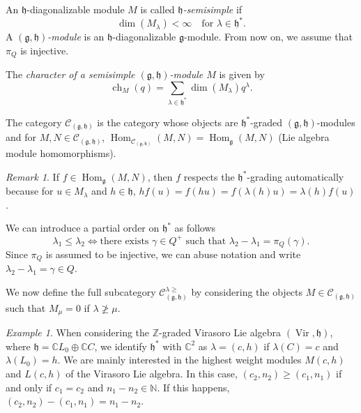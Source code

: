 \documentclass[a4paper, 12pt, reqno]{amsart}
\theoremstyle{remark}
\newtheorem{remark}[theorem]{Remark}
\newtheorem{example}[theorem]{Example}
\DeclareMathOperator{\Vir}{Vir}
\DeclareMathOperator{\ch}{ch}
\DeclareMathOperator{\Hom}{Hom}
\begin{document}
An $\mathfrak{h}$-diagonalizable module $M$ is called \emph{$\mathfrak{h}$-semisimple} if
\begin{equation*}
  \dim(M_{\lambda}) < \infty \quad \text{for $\lambda \in \mathfrak{h}^*$}.
\end{equation*}
A \emph{$(\mathfrak{g}, \mathfrak{h})$-module} is an $\mathfrak{h}$-diagonalizable $\mathfrak{g}$-module.
From now on, we assume that $\pi_Q$ is injective.

The \emph{character of a semisimple $(\mathfrak{g}, \mathfrak{h})$-module $M$} is given by
\begin{equation*}
  \ch_M(q) = \sum_{\lambda \in \mathfrak{h}^*}\dim(M_{\lambda})q^{\lambda}.
\end{equation*}

The category $\mathcal{C}_{(\mathfrak{g}, \mathfrak{h})}$ is the category whose objects are $\mathfrak{h}^*$-graded $(\mathfrak{g}, \mathfrak{h})$-modules and for $M, N \in \mathcal{C}_{(\mathfrak{g}, \mathfrak{h})}$, $\Hom_{\mathcal{C}_{(\mathfrak{g}, \mathfrak{h})}}(M, N) = \Hom_{\mathfrak{g}}(M, N)$ (Lie algebra module homomorphisms).

\begin{remark}
  \label{rmk:1}
  If $f \in \Hom_{\mathfrak{g}}(M, N)$, then $f$ respects the $\mathfrak{h}^*$-grading automatically because for $u \in M_{\lambda}$ and $h \in \mathfrak{h}$, $hf(u) = f(hu) = f(\lambda(h)u) = \lambda(h)f(u)$.
\end{remark}

We can introduce a partial order on $\mathfrak{h}^*$ as follows
\begin{equation*}
  \lambda_1 \le \lambda_2 \iff \text{there exists $\gamma \in Q^+$ such that $\lambda_2 - \lambda_1 = \pi_Q(\gamma)$.}
\end{equation*}
Since $\pi_Q$ is assumed to be injective, we can abuse notation and write $\lambda_2 - \lambda_1 = \gamma \in Q$.

We now define the full subcategory $\mathcal{C}^{\lambda \ge}_{(\mathfrak{g}, \mathfrak{h})}$ by considering the objects $M \in \mathcal{C}_{(\mathfrak{g}, \mathfrak{h})}$ such that $M_{\mu} = 0$ if $\lambda \ngeq \mu$.

\begin{example}
  \label{exa:3}
  When considering the $\mathbb{Z}$-graded Virasoro Lie algebra $(\Vir, \mathfrak{h})$, where $\mathfrak{h} = \mathbb{C}L_0 \oplus \mathbb{C}C$, we identify $\mathfrak{h}^*$ with $\mathbb{C}^2$ as $\lambda = (c, h)$ if $\lambda(C) = c$ and $\lambda(L_0) = h$.
  We are mainly interested in the highest weight modules $M(c, h)$ and $L(c, h)$ of the Virasoro Lie algebra.
  In this case, $(c_2, n_2) \ge (c_1, n_1)$ if and only if $c_1 = c_2$ and $n_1 - n_2 \in \mathbb{N}$.
  If this happens, $(c_2, n_2) - (c_1, n_1) = n_1 - n_2$.
\end{example}
\end{document}
